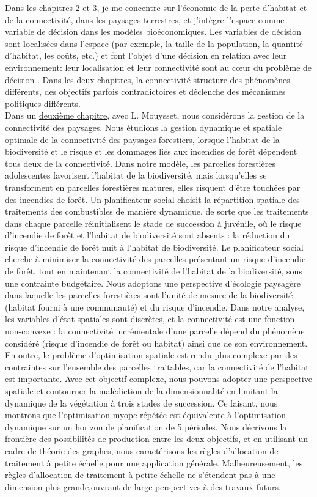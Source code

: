 Dans les chapitres 2 et 3, je me concentre sur l'économie de la perte d'habitat et de la connectivité, dans les paysages terrestres, et j'intègre l'espace comme variable de décision dans les modèles bioéconomiques. Les variables de décision sont localisées dans l'espace (par exemple, la taille de la population, la quantité d'habitat, les coûts, etc.) et font l'objet d'une décision en relation avec leur environnement: leur localisation et leur connectivité sont au cœur du problème de décision . Dans les deux chapitres, la connectivité structure des phénomènes différents, des objectifs parfois contradictoires et déclenche des mécanismes politiques différents. \\


Dans un \hyperref[chapitre2]{deuxième chapitre}, avec L. Mouysset, nous considérons la gestion de la connectivité des paysages. Nous étudions la gestion dynamique et spatiale optimale de la connectivité des paysages forestiers, lorsque l'habitat de la biodiversité et le risque et les dommages liés aux incendies de forêt dépendent tous deux de la connectivité. Dans notre modèle, les parcelles forestières adolescentes favorisent l'habitat de la biodiversité, mais lorsqu'elles se transforment en parcelles forestières matures, elles risquent d'être touchées par des incendies de forêt. Un planificateur social choisit la répartition spatiale des traitements des combustibles de manière dynamique, de sorte que les traitements dans chaque parcelle réinitialisent le stade de succession à juvénile, où le risque d'incendie de forêt et l'habitat de biodiversité sont absents : la réduction du risque d'incendie de forêt nuit à l'habitat de biodiversité. Le planificateur social cherche à minimiser la connectivité des parcelles présentant un risque d'incendie de forêt, tout en maintenant la connectivité de l'habitat de la biodiversité, sous une contrainte budgétaire.
Nous adoptons une perspective d'écologie paysagère dans laquelle les parcelles forestières sont l'unité de mesure de la biodiversité (habitat fourni à une communauté) et du risque d'incendie.  Dans notre analyse, les variables d'état spatiales sont discrètes, et la connectivité est une fonction non-convexe : la connectivité incrémentale d'une parcelle dépend du phénomène considéré (risque d'incendie de forêt ou habitat) ainsi que de son environnement. En outre, le problème d'optimisation spatiale est rendu plus complexe par des contraintes sur l'ensemble des parcelles traitables, car la connectivité de l'habitat est importante. Avec cet objectif complexe, nous pouvons adopter une perspective spatiale et contourner la malédiction de la dimensionnalité en limitant la dynamique de la végétation à trois stades de succession. Ce faisant, nous montrons que l'optimisation myope répétée est équivalente à l'optimisation dynamique sur un horizon de planification de 5 périodes. Nous décrivons la frontière des possibilités de production entre les deux objectifs, et en utilisant un cadre de théorie des graphes, nous caractérisons les règles d'allocation de traitement à petite échelle pour une application générale. Malheureusement, les règles d'allocation de traitement à petite échelle ne s'étendent pas à une dimension plus grande,ouvrant de large perspectives à des travaux futurs.

